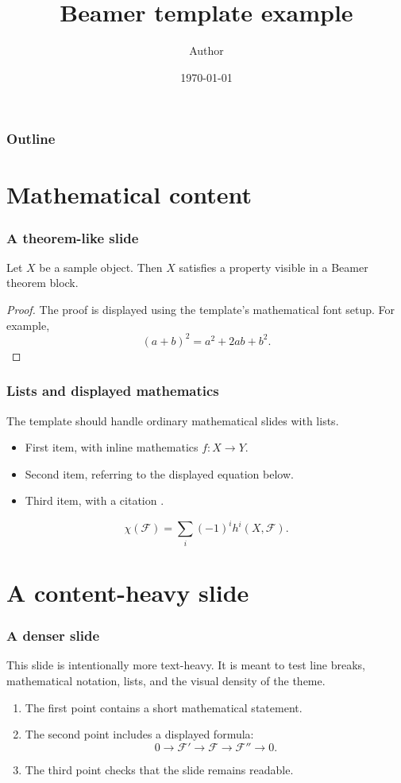 \documentclass{beamer}
\title[Beamer example]{Beamer template example}
\author{Author}
\institute{Institution}
\date{\today}
\begin{document}
\frame{\titlepage}

\begin{frame}
\frametitle{Outline}
\tableofcontents
\end{frame}

\section{Mathematical content}

\begin{frame}
  \frametitle{A theorem-like slide}

  \begin{theorem}
    Let \(X\) be a sample object. Then \(X\) satisfies a property visible in a
    Beamer theorem block.
  \end{theorem}

  \begin{proof}
    The proof is displayed using the template's mathematical font setup. For
    example,
    \[
      (a+b)^2 = a^2 + 2ab + b^2.
    \]
  \end{proof}

\end{frame}

\begin{frame}
  \frametitle{Lists and displayed mathematics}

  The template should handle ordinary mathematical slides with lists.

  \begin{itemize}
    \item First item, with inline mathematics \(f \colon X \to Y\).
    \item Second item, referring to the displayed equation below.
    \item Third item, with a citation \cite{har77}.
  \end{itemize}

  \[
    \chi(\mathscr{F}) =
    \sum_i (-1)^i h^i(X,\mathscr{F}).
  \]
\end{frame}

\section{A content-heavy slide}

\begin{frame}
  \frametitle{A denser slide}

  This slide is intentionally more text-heavy. It is meant to test line breaks,
  mathematical notation, lists, and the visual density of the theme.

  \begin{enumerate}
    \item The first point contains a short mathematical statement.
    \item The second point includes a displayed formula:
      \[
        0 \to \mathscr{F}' \to \mathscr{F} \to \mathscr{F}'' \to 0.
      \]
    \item The third point checks that the slide remains readable.
  \end{enumerate}
\end{frame}
\end{document}
